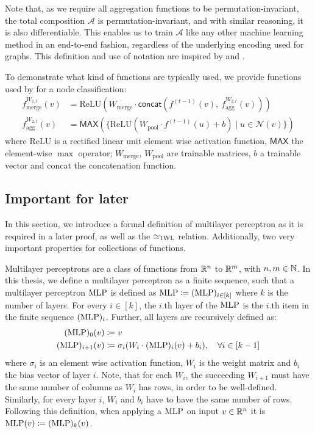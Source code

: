 Note that, as we require all aggregation functions to be permutation-invariant, the total composition $\mathcal{A}$ is permutation-invariant, and with similar reasoning, it is also differentiable. This enables us to train $\mathcal{A}$ like any other machine learning method in an end-to-end fashion, regardless of the underlying encoding used for graphs. This definition and use of notation are inspired by \cite{Morris2018} and \cite{Xu2018}.

To demonstrate what kind of functions are typically used, we provide functions used by \cite{Ham+2017} for a node classification:
\begin{align*}
    f^{W_{1,t}}_{\text{merge}}(v) &= \text{ReLU} (W_{\text{merge}} \cdot \textsf{concat}(f^{(t-1)}(v), \ f^{W_{2,t}}_{\text{agg}}(v)))\\
    f^{W_{2,t}}_{\text{agg}}(v) &= \textsf{MAX}(\{ \text{ReLU}(W_{\text{pool}} \cdot f^{(t-1)}(u) + b) \mid u \in \mathcal{N}(v)\})
\end{align*}
where $\text{ReLU}$ is a rectified linear unit element wise activation function, $\textsf{MAX}$ the element-wise $\max$ operator; $W_{\text{merge}}$, $W_{\text{pool}}$ are trainable matrices, $b$ a trainable vector and \textsf{concat} the concatenation function.



\subsection{Important for later}
In this section, we introduce a formal definition of multilayer perceptron as it is required in a later proof, as well as the $\simeq_{\text{1WL}}$ relation. Additionally, two very important properties for collections of functions.

\begin{definition}\label{def:mlp}
    Multilayer perceptrons are a class of functions from $\mathbb{R}^n$ to $\mathbb{R}^m$, with $n,m \in \mathbb{N}$. In this thesis, we define a multilayer perceptron as a finite sequence, such that a multilayer perceptron $\text{MLP}$ is defined as $\text{MLP} \coloneqq (\text{MLP})_{i\in[k]}$ where $k$ is the number of layers. For every $i \in [k]$, the $i$.th layer of the $\text{MLP}$ is the $i$.th item in the finite sequence $(\text{MLP})_i$. Further, all layers are recursively defined as:
    \begin{align*}
        (\text{MLP})_{0}(v) &\coloneqq v\\
        (\text{MLP})_{i+1}(v) &\coloneqq \sigma_i(W_i \cdot (\text{MLP})_{i} (v) + b_i), \quad \forall i \in [k-1]
    \end{align*}
    where $\sigma_i$ is an element wise activation function, $W_i$ is the weight matrix and $b_i$ the bias vector of layer $i$. Note, that for each $W_i$, the succeeding $W_{i+1}$ must have the same number of columns as $W_i$ has rows, in order to be well-defined. Similarly, for every layer $i$, $W_i$ and $b_i$ have to have the same number of rows.
    Following this definition, when applying a $\text{MLP}$ on input $v \in \mathbb{R}^n$ it is $\text{MLP}(v) \coloneqq (\text{MLP})_k(v)$.
\end{definition}

